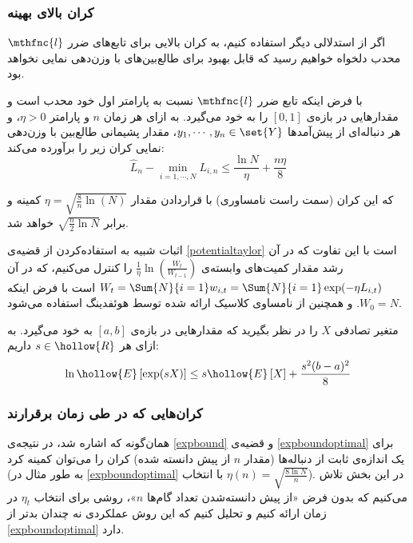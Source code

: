 \subsubsection{
کران بالای بهینه
}
اگر از استدلالی دیگر استفاده کنیم، به کران بالایی برای تابع‌های ضرر
$\mthfnc{l}$ 
محدب دلخواه خواهیم رسید که قابل بهبود برای طالع‌بین‌‌های با وزن‌دهی نمایی نخواهد بود.
\begin{theorem}
\label{expboundoptimal}
با فرض اینکه تابع ضرر 
$\mthfnc{l}$ 
نسبت به پارامتر اول خود محدب است و مقدارهایی در بازه‌ی 
$[0,1]$ 
را به خود می‌گیرد. به ازای هر زمان 
$n$ 
و پارامتر 
$\eta > 0$، 
و هر دنباله‌ای از پیش‌آمدها 
$y_1, \cdots, y_n \in \set{Y}$، 
مقدار پشیمانی طالع‌بین با وزن‌دهی نمایی کران زیر را برآورده می‌کند:
\[
\hat{L}_n - \min_{i=1,\cdots,N} L_{i,n} \leq \frac{\ln N}{\eta} + \frac{n \eta}{8}
\]

که این کران (سمت راست نامساوری) با قراردادن مقدار 
$\eta = \sqrt{ \frac{8}{n} \ln(N) }$ 
کمینه و برابر 
$\sqrt{\frac{n}{2}\ln N}$ 
خواهد شد.
\end{theorem}

اثبات شبیه به استفاده‌کردن از قضیه‌ی 
\ref{potentialtaylor} 
است با این تفاوت که در آن رشد مقدار کمیت‌های وابسته‌ی 
$\frac{1}{\eta} \ln \left( \frac{W_t}{W_{t-1}} \right)$ 
را کنترل می‌کنیم، که در آن 
$W_t = \Sum{N}{i=1} w_{i,t} = \Sum{N}{i=1} \exp( -\eta L_{i,t} )$ 
است با فرض اینکه 
$W_0 = N$. 
و همچنین از نامساوی کلاسیک ارائه شده توسط هوئفدینگ
\cite{hoeffding1963} 
استفاده می‌شود.
\begin{lemma}
\label{hoeffding}
متغیر تصادفی 
$X$ 
را در نظر بگیرید که مقدارهایی در بازه‌ی 
$[a,b]$ 
به خود می‌گیرد. به ازای هر 
$s \in \hollow{R}$ 
داریم:
\[
\ln \hollow{E} \left[ \exp(s X) \right] \leq s \hollow{E} \left[ X \right] + \frac{ s^2 (b-a)^2 }{8}
\]

\end{lemma}


\subsubsection{
کران‌هایی که در طی زمان برقرارند
}
همان‌گونه که اشاره شد، در نتیجه‌ی
\ref{expbound} 
و قضیه‌ی 
\ref{expboundoptimal} 
برای یک اندازه‌ی ثابت از دنباله‌ها (مقدار 
$n$ 
از پیش دانسته شده) کران را می‌توان کمینه کرد (به طور مثال در
\ref{expboundoptimal} 
با انتخاب 
$\eta(n) = \sqrt{\frac{8 \ln N}{n}}$). 
در این بخش تلاش می‌کنیم که بدون فرض «از پیش دانسته‌شدن تعداد گام‌ها 
$n$»، 
روشی برای انتخاب 
$\eta_t$ 
در زمان ارائه کنیم و تحلیل کنیم که این روش عملکردی نه چندان بدتر از 
\ref{expboundoptimal} 
دارد.

